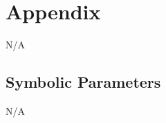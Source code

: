 \documentclass[12pt, titlepage]{article}
\begin{document}
\section{Appendix}
N/A

\subsection{Symbolic Parameters}
N/A

\newpage



\end{document}
